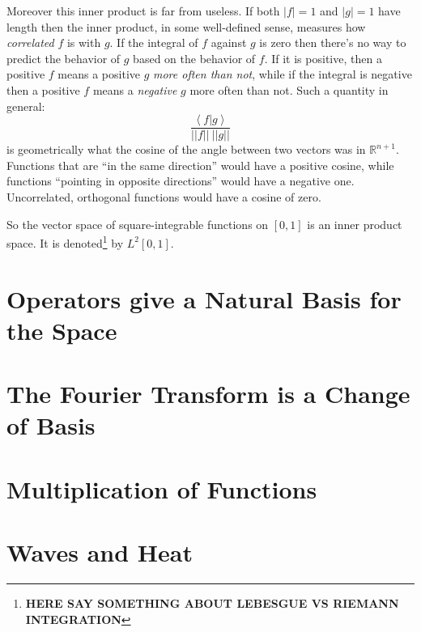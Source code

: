 	Moreover this inner product is far from useless. If both $|f|=1$ and $|g|=1$ have length then the inner product, in some well-defined sense, measures how \emph{correlated} $f$ is with $g$. If the integral of $f$ against $g$ is zero then there's no way to predict the behavior of $g$ based on the behavior of $f$. If it is positive, then a positive $f$ means a positive $g$ \emph{more often than not}, while if the integral is negative then a positive $f$ means a \emph{negative} $g$ more often than not. Such a quantity in general: 
	\begin{equation*}
		\frac{\left< f | g \right>}{||f|| ~ ||g||}
	\end{equation*}
	is geometrically what the cosine of the angle between two vectors was in $\mathbb R^{n+1}$. Functions that are ``in the same direction'' would have a positive cosine, while functions ``pointing in opposite directions'' would have a negative one. Uncorrelated, orthogonal functions would have a cosine of zero.
	
	So the vector space of square-integrable functions on $[0,1]$ is an inner product space. It is denoted\footnote{\textbf{HERE SAY SOMETHING ABOUT LEBESGUE VS RIEMANN INTEGRATION}} by $L^2[0,1]$. 
	

\section{Operators give a Natural Basis for the Space} %
\label{sec:operators_give_a_natural_basis_for_the_space}


\section{The Fourier Transform is a Change of Basis} %
\label{sec:the_fourier_transform_is_a_change_of_basis}


\section{Multiplication of Functions} %
\label{sec:multiplication_of_functions}


\section{Waves and Heat} %
\label{sec:waves_and_heat}

